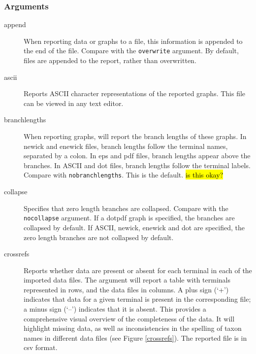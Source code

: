 	\subsubsection{Arguments}
	\begin{description}
		
		\item[append] When reporting data or graphs to a file, this information is 
		appended to the end of the file. Compare with the \texttt{overwrite} argument.
		By default, files are appended to the report, rather than overwritten. 

		\item[ascii] Reports ASCII character representations of the reported graphs.
		This file can be viewed in any text editor.
		
		\item[branchlengths] When reporting graphs, \phyg will report the branch 
		lengths of these graphs. In newick and enewick files, branch lengths 
		follow the terminal names, separated by a colon. In eps and pdf files, 
		branch lengths appear above the branches. In ASCII and dot files, branch 
		lengths follow the terminal labels. Compare with \texttt{nobranchlengths}. 
		This is the default. \hl{is this okay?}

		\item[collapse] Specifies that zero length branches are collapsed. Compare 
		with the \texttt{nocollapse} argument. If a dotpdf graph is specified, the 
		branches are collapsed by default. If ASCII, newick, enewick and dot are 
		specified, the zero length branches are not collapsed by default.  		
		
		\item[crossrefs] Reports whether data are present or absent for each terminal 
		in each of the imported data files. The argument will report a table with terminals 
		represented in rows, and the data files in columns. A plus sign (`+') indicates that 
		data for a given terminal is present in the corresponding file; a minus sign (`--') 
		indicates that it is absent. This provides a comprehensive visual overview of the 
		completeness of the data. It will highlight missing data, as well as inconsistencies 
		in the spelling of taxon names in different data files (see Figure \ref{crossrefs}).  
		The reported file is in csv format.
		

\end{description}
